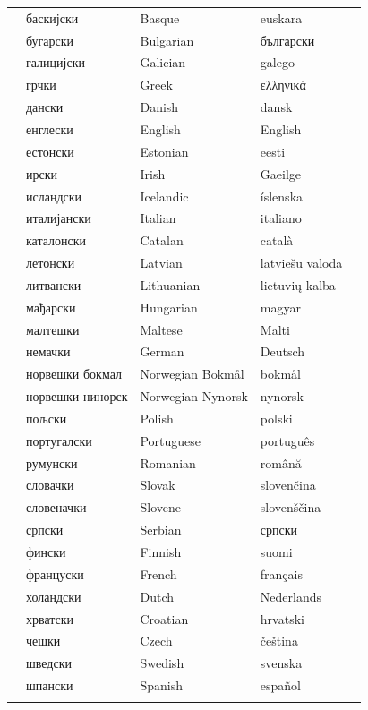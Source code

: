   \centering
    \setlength{\tabcolsep}{2em}
    \begin{tabularx}{\textwidth}{lllll} \toprule\addlinespace
 & баскијски & Basque & euskara\\
  &бугарски & Bulgarian & български \\
  &галицијски & Galician & galego\\
  &грчки & Greek & ελληνικά \\
  &дански & Danish & dansk\\
  &енглески & English & English\\
  &естонски & Estonian & eesti\\
  &ирски & Irish & Gaeilge\\
  &исландски & Icelandic & íslenska \\
  &италијански & Italian & italiano\\
  &каталонски & Catalan & català \\
  &летонски & Latvian &  latviešu valoda\\
  &литвански & Lithuanian & lietuvių kalba\\
  &мађарски & Hungarian & magyar\\
  &малтешки & Maltese & Malti\\
  &немачки & German & Deutsch\\
  &норвешки бокмал & Norwegian Bokmål & bokmål \\
  &норвешки нинорск & Norwegian Nynorsk & nynorsk\\
  &пољски & Polish & polski\\
  &португалски & Portuguese & português\\
  &румунски & Romanian & română\\
  &словачки & Slovak & slovenčina\\
  &словеначки & Slovene & slovenščina\\
  &српски & Serbian & српски \\
  &фински & Finnish & suomi\\
  &француски & French & français\\
  &холандски & Dutch & Nederlands\\
  &хрватски & Croatian & hrvatski&\\
  &чешки & Czech & čeština\\
 &шведски & Swedish & svenska\\
 &шпански & Spanish & español\\
   \addlinespace \bottomrule
\end{tabularx}
